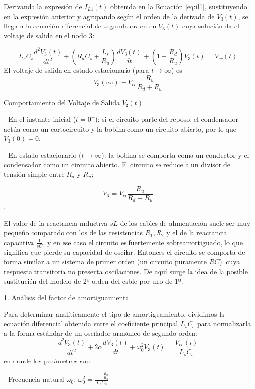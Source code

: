 \documentclass[11pt, a4paper]{article}
\theoremstyle{definition}
\theoremstyle{plain}
\theoremstyle{plain}
\theoremstyle{remark}
\theoremstyle{remark}
\theoremstyle{remark}
\begin{document}
Derivando la expresión de $I_{L1}(t)$ obtenida en la Ecuación \ref{eq:il1}, sustituyendo en la expresión anterior y agrupando según el orden de la derivada de $V_3(t)$, se llega a la ecuación diferencial de segundo orden en $V_3(t)$ cuya solución da el voltaje de salida en el nodo 3:

\begin{equation}
	L_s C_s \frac{d^2V_3(t)}{dt^2} + \left( R_d C_s + \frac{L_s}{R_u} \right) \frac{dV_3(t)}{dt} + \left( 1 + \frac{R_d}{R_u} \right) V_3(t) = V_{cc}(t) 
	\label{eq:odev3}
\end{equation}
El voltaje de salida en estado estacionario (para $t \to \infty$) es
$$V_3(\infty) = V_{cc} \frac{R_u}{R_d + R_u}$$ 

Comportamiento del Voltaje de Salida $V_3(t)$ 

- En el instante inicial ($t = 0^+$): si el circuito parte del reposo, el condensador actúa como un cortocircuito y la bobina como un circuito abierto, por lo que $V_3(0) = 0$.

- En estado estacionario ($t \to \infty$): la bobina se comporta como un conductor y el condensador como un circuito abierto. El circuito se reduce a un divisor de tensión simple entre $R_d$ y $R_u$:

$$V_3 = V_{cc} \frac{R_u}{R_d + R_u}$$.

El valor de la reactancia inductiva $sL$ de los cables de alimentación suele ser muy pequeño comparado con los de las resistencias $R_1, R_2$ y el de la reactancia capacitiva $\frac{1}{sC}$, y en ese caso el circuito es fuertemente sobreamortiguado, lo que significa que pierde su capacidad de oscilar. Entonces el circuito se comporta de forma similar a un sistema de primer orden (un circuito puramente $RC$), cuya respuesta transitoria no presenta oscilaciones. De aquí surge la idea de la posible sustitución del modelo de 2º orden del cable por uno de 1º. 

1. Análisis del factor de amortiguamiento

Para determinar analíticamente el tipo de amortiguamiento, dividimos la ecuación diferencial obtenida entre el coeficiente principal $L_s C_s$ para normalizarla a la forma estándar de un oscilador armónico de segundo orden:
$$\frac{d^2V_3(t)}{dt^2} + 2\alpha \frac{dV_3(t)}{dt} + \omega_0^2 V_3(t) = \frac{V_{cc}(t)}{L_s C_s}$$ 
en donde los parámetros son:

- Frecuencia natural $\omega_0$: $\omega_0^2 = \frac{1 + \frac{R_d}{R_u}}{L_s C_s}$
\end{document}
